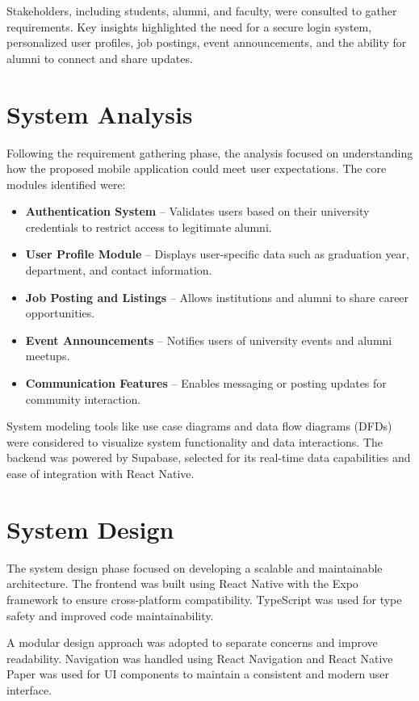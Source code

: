 \documentclass[12pt, a4paper]{report}
\begin{document}
Stakeholders, including students, alumni, and faculty, were consulted to gather requirements. Key insights highlighted the need for a secure login system, personalized user profiles, job postings, event announcements, and the ability for alumni to connect and share updates.

\section{System Analysis}

Following the requirement gathering phase, the analysis focused on understanding how the proposed mobile application could meet user expectations. The core modules identified were:

\begin{itemize}
    \item \textbf{Authentication System} – Validates users based on their university credentials to restrict access to legitimate alumni.
    \item \textbf{User Profile Module} – Displays user-specific data such as graduation year, department, and contact information.
    \item \textbf{Job Posting and Listings} – Allows institutions and alumni to share career opportunities.
    \item \textbf{Event Announcements} – Notifies users of university events and alumni meetups.
    \item \textbf{Communication Features} – Enables messaging or posting updates for community interaction.
\end{itemize}

System modeling tools like use case diagrams and data flow diagrams (DFDs) were considered to visualize system functionality and data interactions. The backend was powered by Supabase, selected for its real-time data capabilities and ease of integration with React Native.

\section{System Design}

The system design phase focused on developing a scalable and maintainable architecture. The frontend was built using React Native with the Expo framework to ensure cross-platform compatibility. TypeScript was used for type safety and improved code maintainability.

A modular design approach was adopted to separate concerns and improve readability. Navigation was handled using React Navigation and React Native Paper was used for UI components to maintain a consistent and modern user interface.
\end{document}
